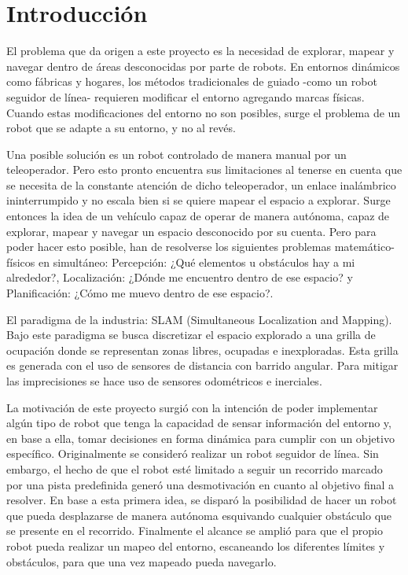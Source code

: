 \section{Introducción}
El problema que da origen a este proyecto es la necesidad de explorar, mapear y navegar dentro de áreas desconocidas por parte de robots. En entornos dinámicos como fábricas y hogares, los métodos tradicionales de guiado -como un robot seguidor de línea- requieren modificar el entorno agregando marcas físicas. Cuando estas modificaciones del entorno no son posibles, surge el problema de un robot que se adapte a su entorno, y no al revés. 

Una posible solución es un robot controlado de manera manual por un teleoperador. Pero esto pronto encuentra sus limitaciones al tenerse en cuenta que se necesita de la constante atención de dicho teleoperador, un enlace inalámbrico ininterrumpido y no escala bien si se quiere mapear el espacio a explorar. Surge entonces la idea de un vehículo capaz de operar de manera autónoma, capaz de explorar, mapear y navegar un espacio desconocido por su cuenta. Pero para poder hacer esto posible, han de resolverse los siguientes problemas matemático-físicos en simultáneo: Percepción: ¿Qué elementos u obstáculos hay a mi alrededor?, Localización: ¿Dónde me encuentro dentro de ese espacio? y Planificación: ¿Cómo me muevo dentro de ese espacio?.

El paradigma de la industria: SLAM (Simultaneous Localization and Mapping). Bajo este paradigma se busca discretizar el espacio explorado a una grilla de ocupación donde se representan zonas libres, ocupadas e inexploradas. Esta grilla es generada con el uso de sensores de distancia con barrido angular. Para mitigar las imprecisiones se hace uso de sensores odométricos e inerciales.

La motivación de este proyecto surgió con la intención de poder implementar algún tipo de robot que tenga la capacidad de sensar información del entorno y, en base a ella, tomar decisiones en forma dinámica para cumplir con un objetivo específico. Originalmente se consideró realizar un robot seguidor de línea. Sin embargo, el hecho de que el robot esté limitado a seguir un recorrido marcado por una pista predefinida generó una desmotivación en cuanto al objetivo final a resolver. En base a esta primera idea, se disparó la posibilidad de hacer un robot que pueda desplazarse de manera autónoma esquivando cualquier obstáculo que se presente en el recorrido. Finalmente el alcance se amplió para que el propio robot pueda realizar un mapeo del entorno, escaneando los diferentes límites y obstáculos, para que una vez mapeado pueda navegarlo.

